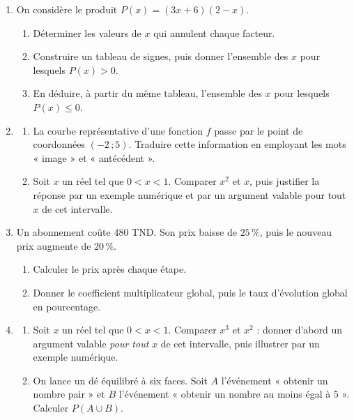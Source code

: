 \documentclass[10pt,a4paper]{article}
\begin{document}
\begin{enumerate}
\needspace{22mm}
\item[\textbf{B1.}] On considère le produit $P(x) = (3x + 6)(2 - x)$.
\begin{enumerate}
\item Déterminer les valeurs de $x$ qui annulent chaque facteur.
\item Construire un tableau de signes, puis donner l'ensemble des $x$ pour lesquels $P(x) > 0$.
\item En déduire, à partir du même tableau, l'ensemble des $x$ pour lesquels $P(x) \leqslant 0$.
\end{enumerate}
\par\vspace{1.2mm}
\needspace{22mm}
\item[\textbf{B2.}] \begin{enumerate}
\item La courbe représentative d'une fonction $f$ passe par le point de coordonnées $(-2\,;5)$.
Traduire cette information en employant les mots « image » et « antécédent ».
\item Soit $x$ un réel tel que $0 < x < 1$. Comparer $x^2$ et $x$, puis justifier la réponse
par un exemple numérique et par un argument valable pour tout $x$ de cet intervalle.
\end{enumerate}
\par\vspace{1.2mm}
\needspace{22mm}
\item[\textbf{B3.}] Un abonnement coûte $480$ TND. Son prix baisse de $25\,\%$, puis le nouveau prix
augmente de $20\,\%$.
\begin{enumerate}
\item Calculer le prix après chaque étape.
\item Donner le coefficient multiplicateur global, puis le taux d'évolution global en pourcentage.
\end{enumerate}
\par\vspace{1.2mm}
\needspace{22mm}
\item[\textbf{B4.}] \begin{enumerate}
\item Soit $x$ un réel tel que $0 < x < 1$. Comparer $x^3$ et $x^2$ : donner d'abord un argument valable
\emph{pour tout} $x$ de cet intervalle, puis illustrer par un exemple numérique.
\item On lance un dé équilibré à six faces. Soit $A$ l'événement « obtenir un nombre pair » et
$B$ l'événement « obtenir un nombre au moins égal à $5$ ». Calculer $P(A\cup B)$.
\end{enumerate}
\par\vspace{1.2mm}
\end{enumerate}
\end{document}
